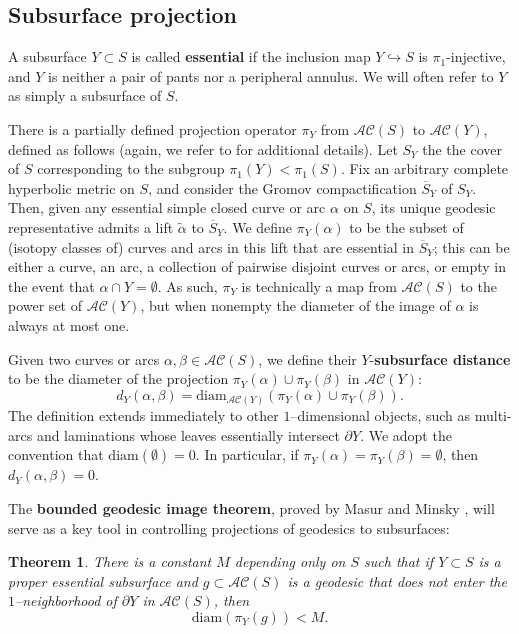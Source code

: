 \documentclass[11pt,letterpaper]{amsart}
\newcommand{\dfnote}[1]{\todo[color=darkgreen,linecolor=darkgreen,size= \footnotesize]{#1}}
\newcommand{\diam}{\mathrm{diam}}
\newcommand{\bdy}{\partial} %
\numberwithin{equation}{section}
\newtheorem{theorem}{Theorem}[section]
\theoremstyle{definition}
\newcommand{\define}[1]{\textbf{#1}}
\newcommand{\AC}{\mathcal{AC}}
\begin{document}
\subsection{Subsurface projection}\label{Sec:Projection}
 A subsurface $Y \subset S$ is called \define{essential} if the inclusion map $Y \hookrightarrow S$ is $\pi_1$-injective, and $Y$ is neither a pair of pants nor a peripheral annulus.
We will often refer to $Y$ as simply a subsurface of $S$. 
 
There is a partially defined projection operator $\pi_{Y}$ from $\AC(S)$ to $\AC (Y)$, defined as follows (again, we refer to \cite{MasurMinsky2} for additional details).
Let $S_Y$ the the cover of $S$ corresponding to the subgroup $\pi_{1}(Y) < \pi_{1}(S)$. Fix an arbitrary complete hyperbolic metric on $S$, and consider the Gromov compactification $\overline S_Y$ of $S_Y$.
Then, given any essential simple closed curve or arc $\alpha$ on $S$, its unique geodesic representative admits a lift $\tilde{\alpha}$ to $\overline S_Y$. We define $\pi_{Y}(\alpha)$ to be the subset of (isotopy classes of) curves and arcs in this lift that are essential in $\overline S_Y$; this can be either a curve, an arc, a collection of pairwise disjoint curves or arcs, or empty in the event that $\alpha \cap Y = \emptyset$. As such, $\pi_{Y}$ is technically a map from $\AC(S)$ to the power set of $\AC (Y)$, but when nonempty the diameter of the image of $\alpha$ is always at most one. 

Given two curves or arcs $\alpha, \beta \in \AC(S)$, we define their $Y$-\define{subsurface distance} to be the diameter of the projection $\pi_{Y}(\alpha) \cup \pi_{Y}(\beta)$ in $\AC(Y)$:
\[
d_Y(\alpha, \beta) = \diam_{\AC(Y)} (\pi_{Y}(\alpha) \cup \pi_{Y}(\beta)).
\]
The definition extends immediately to other $1$--dimensional objects, such as multi-arcs and laminations whose leaves essentially intersect $\partial Y$.
 We adopt the convention that $\diam(\emptyset) = 0$. In particular, if $\pi_{Y}(\alpha) = \pi_{Y}(\beta) = \emptyset$, then $d_Y(\alpha, \beta) = 0$. 

The \define{bounded geodesic image theorem}, proved by Masur and Minsky \cite[Theorem 3.1]{MasurMinsky2}, will serve as a key tool in controlling projections of geodesics to subsurfaces: 

\begin{theorem} \label{Thm:BGIT} 
There is a constant $M$ depending only on $S$ such that if $Y \subset S$ is a proper essential subsurface and $g \subset \AC(S)$ 
is a geodesic that does not enter the $1$--neighborhood of $\bdy Y$ in $\AC(S)$, then 
\[ \mathrm{diam}(\pi_{Y}(g)) < M.\]
\end{theorem}
\end{document}
